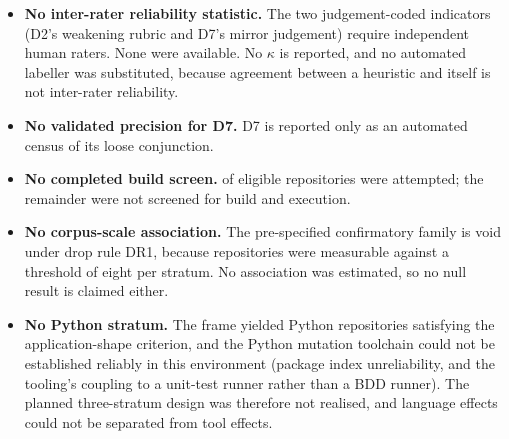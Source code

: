 \begin{itemize}
\item \textbf{No inter-rater reliability statistic.} The two judgement-coded indicators (D2's weakening
      rubric and D7's mirror judgement) require independent human raters. None were available. No
      $\kappa$ is reported, and no automated labeller was substituted, because agreement between a
      heuristic and itself is not inter-rater reliability.
\item \textbf{No validated precision for D7.} D7 is reported only as an automated census of its loose
      conjunction.
\item \textbf{No completed build screen.} \Nbuildtested{} of \Neligible{} eligible repositories were
      attempted; the remainder were not screened for build and execution.
\item \textbf{No corpus-scale association.} The pre-specified confirmatory family is void under drop
      rule DR1, because \Nmeasured{} repositories were measurable against a threshold of eight per
      stratum. No association was estimated, so no null result is claimed either.
\item \textbf{No Python stratum.} The frame yielded \NpyEligible{} Python repositories satisfying the
      application-shape criterion, and the Python mutation toolchain could not be established
      reliably in this environment (package index unreliability, and the tooling's coupling to a
      unit-test runner rather than a BDD runner). The planned three-stratum design was therefore not
      realised, and language effects could not be separated from tool effects.
\end{itemize}

